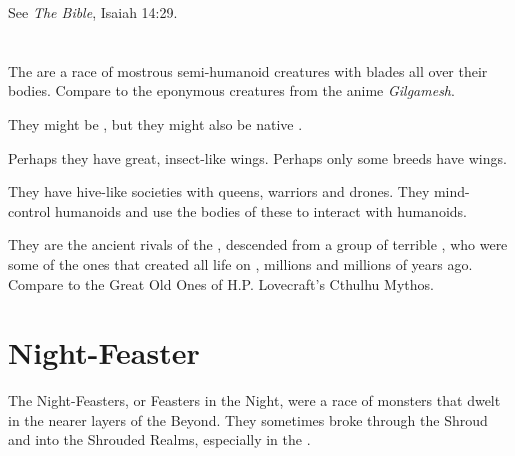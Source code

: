 See \emph{The Bible}, Isaiah 14:29.















\section{\NerasKirishgaith}
The \NerasKirishgaith{} are a race of mostrous semi-humanoid creatures with blades all over their bodies. Compare to the eponymous creatures from the anime \emph{Gilgamesh}. 

They might be \banes, but they might also be native \Miithians. 

Perhaps they have great, insect-like wings. Perhaps only some breeds have wings. 

They have hive-like societies with queens, warriors and drones. They mind-control humanoids and use the bodies of these to interact with humanoids. 

They are the ancient rivals of the \ophidians, descended from a group of terrible , who were some of the ones that created all life on \Miith{}, millions and millions of years ago. Compare to the Great Old Ones of H.P. Lovecraft's Cthulhu Mythos.















\section{Night-Feaster}
The Night-Feasters, or Feasters in the Night, were a race of monsters that dwelt in the nearer layers of the Beyond. 
They sometimes broke through the Shroud and into the Shrouded Realms, especially in the \wylde. 









